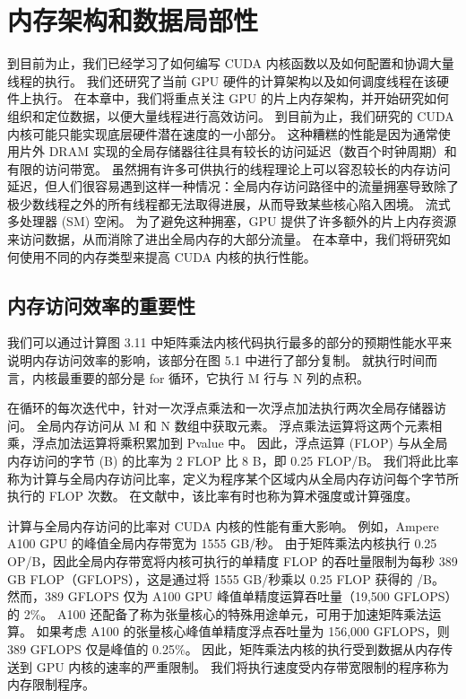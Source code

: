 \section{内存架构和数据局部性}
到目前为止，我们已经学习了如何编写 CUDA 内核函数以及如何配置和协调大量线程的执行。 我们还研究了当前 GPU 硬件的计算架构以及如何调度线程在该硬件上执行。 在本章中，我们将重点关注 GPU 的片上内存架构，并开始研究如何组织和定位数据，以便大量线程进行高效访问。 到目前为止，我们研究的 CUDA 内核可能只能实现底层硬件潜在速度的一小部分。 这种糟糕的性能是因为通常使用片外 DRAM 实现的全局存储器往往具有较长的访问延迟（数百个时钟周期）和有限的访问带宽。 虽然拥有许多可供执行的线程理论上可以容忍较长的内存访问延迟，但人们很容易遇到这样一种情况：全局内存访问路径中的流量拥塞导致除了极少数线程之外的所有线程都无法取得进展，从而导致某些核心陷入困境。 流式多处理器 (SM) 空闲。 为了避免这种拥塞，GPU 提供了许多额外的片上内存资源来访问数据，从而消除了进出全局内存的大部分流量。 在本章中，我们将研究如何使用不同的内存类型来提高 CUDA 内核的执行性能。

\subsection{内存访问效率的重要性}
我们可以通过计算图 3.11 中矩阵乘法内核代码执行最多的部分的预期性能水平来说明内存访问效率的影响，该部分在图 5.1 中进行了部分复制。 就执行时间而言，内核最重要的部分是 for 循环，它执行 M 行与 N 列的点积。

在循环的每次迭代中，针对一次浮点乘法和一次浮点加法执行两次全局存储器访问。 全局内存访问从 M 和 N 数组中获取元素。 浮点乘法运算将这两个元素相乘，浮点加法运算将乘积累加到 Pvalue 中。 因此，浮点运算 (FLOP) 与从全局内存访问的字节 (B) 的比率为 2 FLOP 比 8 B，即 0.25 FLOP/B。 我们将此比率称为计算与全局内存访问比率，定义为程序某个区域内从全局内存访问每个字节所执行的 FLOP 次数。 在文献中，该比率有时也称为算术强度或计算强度。

计算与全局内存访问的比率对 CUDA 内核的性能有重大影响。 例如，Ampere A100 GPU 的峰值全局内存带宽为 1555 GB/秒。 由于矩阵乘法内核执行 0.25 OP/B，因此全局内存带宽将内核可执行的单精度 FLOP 的吞吐量限制为每秒 389 GB FLOP（GFLOPS），这是通过将 1555 GB/秒乘以 0.25 FLOP 获得的 /B。 然而，389 GFLOPS 仅为 A100 GPU 峰值单精度运算吞吐量（19,500 GFLOPS）的 2\%。 A100 还配备了称为张量核心的特殊用途单元，可用于加速矩阵乘法运算。 如果考虑 A100 的张量核心峰值单精度浮点吞吐量为 156,000 GFLOPS，则 389 GFLOPS 仅是峰值的 0.25\%。 因此，矩阵乘法内核的执行受到数据从内存传送到 GPU 内核的速率的严重限制。 我们将执行速度受内存带宽限制的程序称为内存限制程序。

